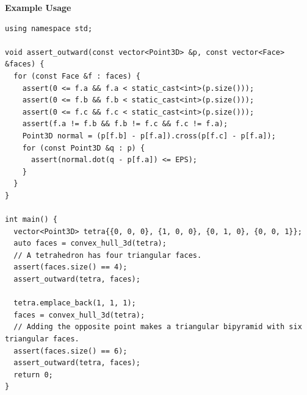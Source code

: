\textbf{Example Usage}\par
\begin{lstlisting}[style=cpp]
using namespace std;

void assert_outward(const vector<Point3D> &p, const vector<Face> &faces) {
  for (const Face &f : faces) {
    assert(0 <= f.a && f.a < static_cast<int>(p.size()));
    assert(0 <= f.b && f.b < static_cast<int>(p.size()));
    assert(0 <= f.c && f.c < static_cast<int>(p.size()));
    assert(f.a != f.b && f.b != f.c && f.c != f.a);
    Point3D normal = (p[f.b] - p[f.a]).cross(p[f.c] - p[f.a]);
    for (const Point3D &q : p) {
      assert(normal.dot(q - p[f.a]) <= EPS);
    }
  }
}

int main() {
  vector<Point3D> tetra{{0, 0, 0}, {1, 0, 0}, {0, 1, 0}, {0, 0, 1}};
  auto faces = convex_hull_3d(tetra);
  // A tetrahedron has four triangular faces.
  assert(faces.size() == 4);
  assert_outward(tetra, faces);

  tetra.emplace_back(1, 1, 1);
  faces = convex_hull_3d(tetra);
  // Adding the opposite point makes a triangular bipyramid with six triangular faces.
  assert(faces.size() == 6);
  assert_outward(tetra, faces);
  return 0;
}
\end{lstlisting}
